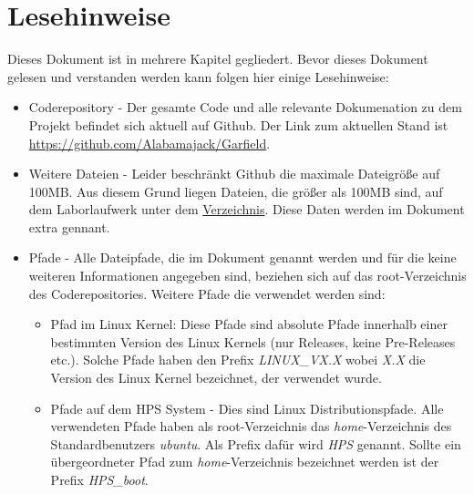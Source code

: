 \section{Lesehinweise}
Dieses Dokument ist in mehrere Kapitel gegliedert. Bevor dieses Dokument gelesen und verstanden werden kann folgen hier einige Lesehinweise:
\begin{itemize}
	\item Coderepository - Der gesamte Code und alle relevante Dokumenation zu dem Projekt befindet sich aktuell auf Github. Der Link zum aktuellen Stand ist \href{https://github.com/Alabamajack/Garfield}{https://github.com/Alabamajack/Garfield}. 
	\item Weitere Dateien - Leider beschränkt Github die maximale Dateigröße auf 100MB. Aus diesem Grund liegen Dateien, die größer als 100MB sind, auf dem Laborlaufwerk unter dem \href{run:L:/DT/Lehrveranstaltungen/Prof Metzner/HSP/Garfield_Wise1617}{Verzeichnis}. Diese Daten werden im Dokument extra gennant.
	\item Pfade - Alle Dateipfade, die im Dokument genannt werden und für die keine weiteren Informationen angegeben sind, beziehen sich auf das root-Verzeichnis des Coderepositories. Weitere Pfade die verwendet werden sind:
	\begin{itemize}
		\item Pfad im Linux Kernel: Diese Pfade sind absolute Pfade innerhalb einer bestimmten Version des Linux Kernels (nur Releases, keine Pre-Releases etc.). Solche Pfade haben den Prefix \textit{LINUX\_VX.X} wobei \textit{X.X} die Version des Linux Kernel bezeichnet, der verwendet wurde.
		\item Pfade auf dem \ac{HPS} System - Dies sind Linux Distributionspfade. Alle verwendeten Pfade haben als root-Verzeichnis das \textit{home}-Verzeichnis des Standardbenutzers \textit{ubuntu}. Als Prefix dafür wird \textit{HPS} genannt. Sollte ein übergeordneter Pfad zum \textit{home}-Verzeichnis bezeichnet werden ist der Prefix \textit{HPS\_boot}.
	\end{itemize}
\end{itemize}